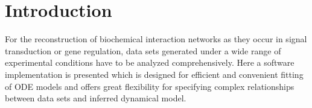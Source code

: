 \documentclass{bioinfo}
\begin{document}
\section{Introduction}
For the reconstruction of biochemical interaction networks as they occur in signal transduction or gene regulation, data sets generated under a wide range of experimental conditions have to be analyzed comprehensively.
Here a software implementation is presented which is designed for efficient and convenient fitting of ODE models and offers great flexibility for specifying complex relationships between data sets and inferred dynamical model.


\end{document}
